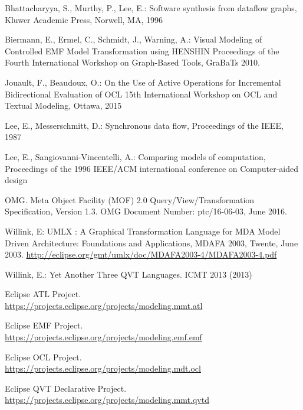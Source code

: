 \documentclass[conference]{IEEEtran}
\begin{document}

%
%
%
\begin{thebibliography}{1}

Bhattacharyya, S., Murthy, P., Lee, E.: Software synthesis from dataflow graphs, Kluwer Academic Press, Norwell, MA, 1996

Biermann, E., Ermel, C., Schmidt, J., Warning, A.:
Visual Modeling of Controlled EMF Model Transformation using HENSHIN
Proceedings of the Fourth International Workshop on Graph-Based Tools, GraBaTs 2010.

Jouault, F., Beaudoux, O.:
On the Use of Active Operations for Incremental Bidirectional Evaluation of OCL
15th International Workshop on OCL and Textual Modeling, Ottawa, 2015

Lee, E., Messerschmitt, D.: Synchronous data flow, Proceedings of the IEEE, 1987

Lee, E., Sangiovanni-Vincentelli, A.: Comparing models of computation, Proceedings of the 1996 IEEE/ACM international conference on Computer-aided design

OMG. Meta Object Facility (MOF) 2.0 Query/View/Transformation Specification, Version 1.3.
OMG Document Number: ptc/16-06-03, June 2016.

Willink, E: UMLX : A Graphical Transformation Language for MDA
Model Driven Architecture: Foundations and Applications, MDAFA 2003, Twente, June 2003.
\url{http://eclipse.org/gmt/umlx/doc/MDAFA2003-4/MDAFA2003-4.pdf}

Willink, E.:
Yet Another Three QVT Languages.
ICMT 2013 (2013)

Eclipse ATL Project.\\
\url{https://projects.eclipse.org/projects/modeling.mmt.atl}

Eclipse EMF Project.\\
\url{https://projects.eclipse.org/projects/modeling.emf.emf}

Eclipse OCL Project.\\
\url{https://projects.eclipse.org/projects/modeling.mdt.ocl}

Eclipse QVT Declarative Project.\\
\url{https://projects.eclipse.org/projects/modeling.mmt.qvtd}
\end{thebibliography}




\end{document}
